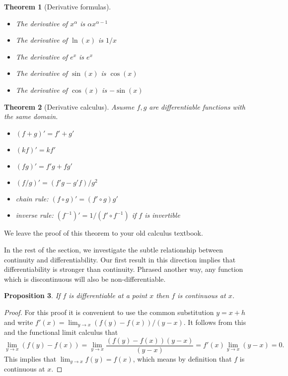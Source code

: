 \documentclass[11pt,oneside]{amsbook}
\theoremstyle{definition}
\theoremstyle{plain}
\newtheorem{theorem}{Theorem}[section]
\newtheorem{proposition}[theorem]{Proposition}
\theoremstyle{definition}
\theoremstyle{remark}
\numberwithin{equation}{section}
\numberwithin{figure}{section}
\begin{document}
\begin{theorem}[Derivative formulas]
  \begin{itemize}
    \item The derivative of $x^\alpha$ is $\alpha x^{\alpha-1}$
    \item The derivative of $\ln(x)$ is $1/x$
    \item The derivative of $e^x$ is $e^x$
    \item The derivative of $\sin(x)$ is $\cos(x)$
    \item The derivative of $\cos(x)$ is $-\sin(x)$
  \end{itemize}
\end{theorem}

\begin{theorem}[Derivative calculus]
  Asusme $f,g$ are differentiable functions with the same domain.
  \begin{itemize}
    \item $(f+g)'=f'+g'$
    \item $(kf)'=kf'$
    \item $(fg)'=f'g+fg'$
    \item $(f/g)'=(f'g-g'f)/g^2$
    \item chain rule: $(f\circ g)'=(f'\circ g)g'$
    \item inverse rule: $(f^{-1})'=1/(f'\circ f^{-1})$ if $f$ is invertible
  \end{itemize}
\end{theorem}

We leave the proof of this theorem to your old calculus textbook.

In the rest of the section, we investigate the subtle relationship between continuity and differentiability. Our first result in this direction implies that differentiability is stronger than continuity. Phrased another way, any function which is discontinuous will also be non-differentiable.

\begin{proposition}
  If $f$ is differentiable at a point $x$ then $f$ is continuous at $x$.
\end{proposition}

\begin{proof}
  For this proof it is convenient to use the common substitution $y=x+h$ and write $f'(x)=\lim_{y\to x}(f(y)-f(x))/(y-x)$. It follows from this and the functional limit calculus that
\[\lim_{y\to x}(f(y)-f(x))=\lim_{y\to x}\frac{(f(y)-f(x))(y-x)}{(y-x)}
=f'(x)\lim_{y\to x}(y-x)=0\text{.}
\]
This implies that $\lim_{y\to x}f(y)=f(x)$, which means by definition that $f$ is continuous at $x$.
\end{proof}
\end{document}
